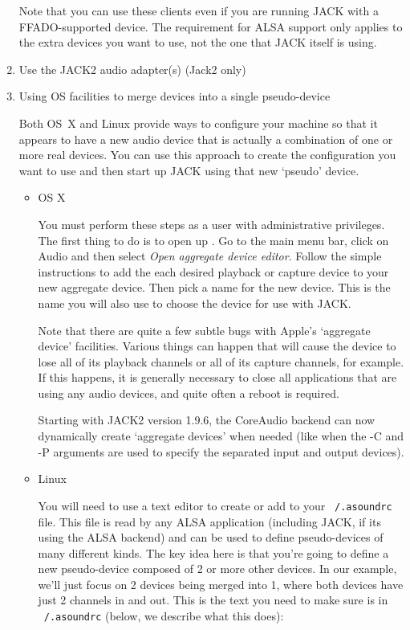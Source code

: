 \documentclass[10pt,a4paper]{book}
\newcommand{\button}[1]{#1}
\newcommand{\menu}[1]{\emph{\StrSubstitute{#1}{,}{ $\rightarrow$ }}}
\begin{document}
\begin{enumerate}
Note that you can use these clients even if you are running JACK with
a FFADO-supported device. The requirement for ALSA support only
applies to the extra devices you want to use, not the one that JACK
itself is using.

\item Use the JACK2 audio adapter(s) (Jack2 only)


\item Using OS facilities to merge devices into a single pseudo-device

Both OS~X and Linux provide ways to configure your machine so that it
appears to have a new audio device that is actually a combination of
one or more real devices. You can use this approach to create the
configuration you want to use and then start up JACK using that new
`pseudo' device.

\begin{itemize}
\item OS X

You must perform these steps as a user with administrative
privileges. The first thing to do is to open up
\menu{Applications,Utilities,Audio/MIDI Setup}. Go to the main menu
bar, click on \button{Audio} and then select \emph{Open aggregate device
editor}. Follow the simple instructions to add the each desired
playback or capture device to your new aggregate device. Then pick a
name for the new device. This is the name you will also use to choose
the device for use with JACK\@.

Note that there are quite a few subtle bugs with Apple's `aggregate
device' facilities. Various things can happen that will cause the
device to lose all of its playback channels or all of its capture
channels, for example. If this happens, it is generally necessary to
close all applications that are using any audio devices, and quite
often a reboot is required.

Starting with JACK2 version 1.9.6, the CoreAudio backend can now
dynamically create `aggregate devices' when needed (like when the -C
and -P arguments are used to specify the separated input and output
devices).

\item Linux

You will need to use a text editor to create or add to your
\texttt{~/.asoundrc} file. This file is read by any ALSA application
(including JACK, if its using the ALSA backend) and can be used to
define pseudo-devices of many different kinds. The key idea here is
that you're going to define a new pseudo-device composed of 2 or more
other devices. In our example, we'll just focus on 2 devices being
merged into 1, where both devices have just 2 channels in and
out. This is the text you need to make sure is in \texttt{~/.asoundrc} (below,
we describe what this does):


\end{itemize}
\end{enumerate}
\end{document}
